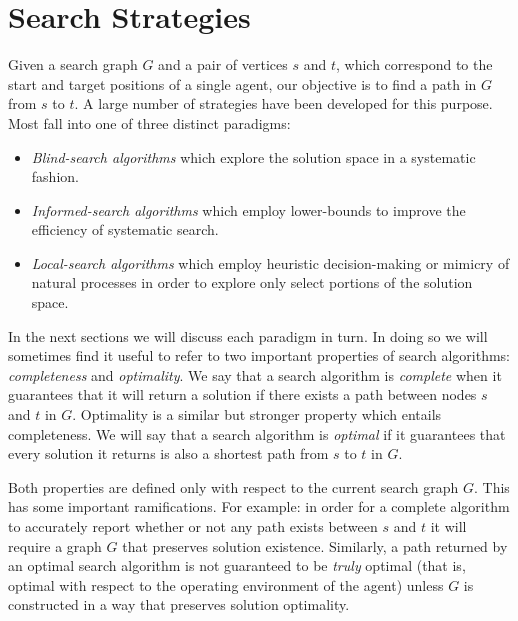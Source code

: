 \section{Search Strategies}
\label{cha::lit::search}
Given a search graph $G$ and a pair of vertices $s$ and $t$, which correspond to the 
start and target positions of a single agent, our objective is to find a path in $G$
from $s$ to $t$.
A large number of strategies have been developed for this purpose. Most fall into
one of three distinct paradigms:
\begin{itemize}
\item{\emph{Blind-search algorithms} which explore the solution space in a systematic fashion.}
\item{\emph{Informed-search algorithms} which employ lower-bounds to improve the 
efficiency of systematic search.}
\item{\emph{Local-search algorithms} which employ heuristic decision-making or mimicry of
natural processes in order to explore only select portions of the solution space.}
\end{itemize}

In the next sections we will discuss each paradigm in turn. In doing so we will sometimes
find it useful to refer to two important properties of search algorithms: \emph{completeness} 
and \emph{optimality}.
We say that a search algorithm is \emph{complete} when it guarantees that it will return a
solution if there exists a path between nodes $s$ and $t$ in $G$. 
Optimality is a similar but stronger property which entails completeness. 
We will say that a search algorithm is \emph{optimal} if it guarantees that every solution it 
returns is also a shortest path from $s$ to $t$ in $G$. 

Both properties are defined only with respect to the current search graph $G$.
This has some important ramifications. For example: 
in order for a complete algorithm to accurately report whether or not any path exists between 
$s$ and $t$ it will require a graph $G$ that preserves solution existence.
Similarly, a path returned by an optimal search algorithm
is not guaranteed to be \emph{truly} optimal (that is, optimal with respect to the operating environment 
of the agent) unless $G$ is constructed in a way that preserves solution optimality.

